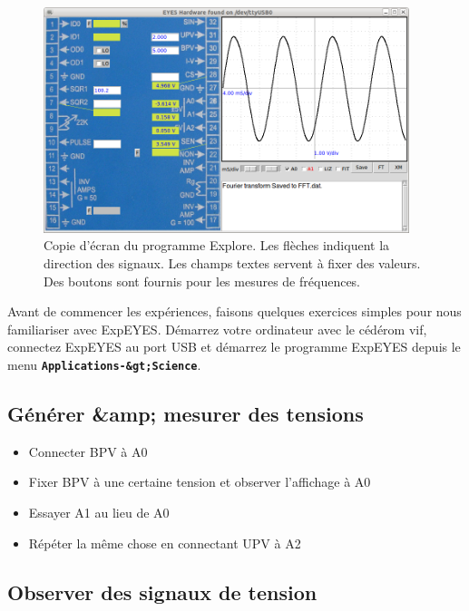 \documentclass{book}
\newcommand{\nop}{}
\begin{document}
\begin{figure}[h!]
\begin{center}
\caption{Copie d'écran du programme Explore. Les flèches indiquent la direction des signaux. Les champs textes servent à fixer des valeurs. Des boutons sont fournis pour les mesures de fréquences. \label{fig:Explorer-screenshot}}\vspace{0.5em}
\includegraphics[width=0.95\textwidth]{explorer.png}
\end{center}
\end{figure}



Avant de commencer les expériences, faisons quelques exercices simples pour nous familiariser avec ExpEYES. Démarrez votre ordinateur avec le cédérom vif, connectez ExpEYES au port USB et démarrez le programme ExpEYES depuis le menu  \texttt{\textbf{Applications-\&gt;Science}\nop}.




\subsection{Générer \&amp; mesurer des tensions}


\begin{itemize}
  \item Connecter BPV à A0
  \item Fixer BPV à une certaine tension et observer l'affichage à A0
  \item Essayer A1 au lieu de A0
  \item Répéter la même chose en connectant UPV à A2
\end{itemize}




\subsection{Observer des signaux de tension}
\end{document}
